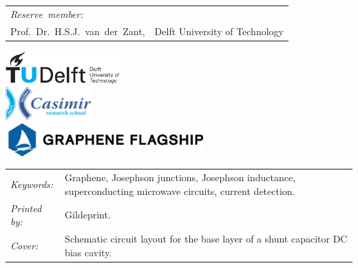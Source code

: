 \begin{titlepage}
\begin{tabular}{p{3.5cm}l}
    \medskip
    \mbox{\emph{Reserve member:}} & \\

    Prof.~Dr.~H.S.J.~van~der~Zant, & Delft University of Technology \\

\end{tabular}


\vfill
\begin{center}
    \centering
    \includegraphics[height=0.5in]{title/logos/tudelft}\\
    \vspace{1em}
    \includegraphics[height=0.5in]{title/logos/casimir}\\
    \vspace{1em}
    \includegraphics[height=0.5in]{title/logos/flagship}
\end{center}
\vfill

\noindent
\begin{tabular}{@{}p{}@{}p{}}
    \textit{Keywords:} & Graphene, Josephson junctions, Josephson inductance, superconducting microwave circuits, current detection. \\
    \textit{Printed by:} &  Gildeprint. \\
    \textit{Cover:} & Schematic circuit layout for the base layer of a shunt capacitor DC bias cavity.
\end{tabular}


\end{titlepage}
